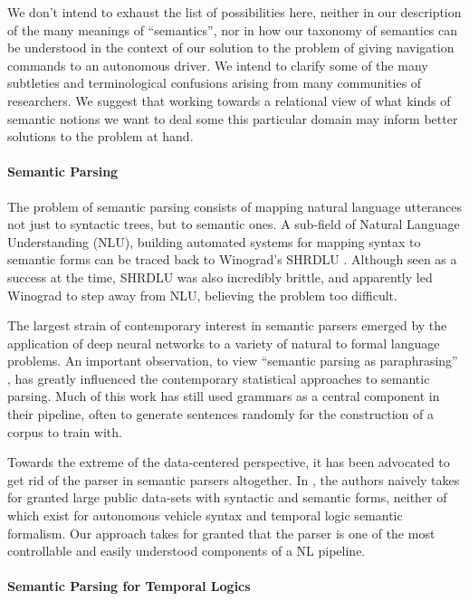 \documentclass{article}
\begin{document}
We don't intend to exhaust the list of possibilities here, neither in our
description of the many meanings of ``semantics'', nor in how our taxonomy of
semantics can be understood in the context of our solution to the problem of
giving navigation commands to an autonomous driver. We intend to clarify some of
the many subtleties and terminological confusions arising from many
communities of researchers. We suggest that working towards a relational view of
what kinds of semantic notions we want to deal some this particular domain may
inform better solutions to the problem at hand.

\paragraph{Semantic Parsing}

The problem of semantic parsing consists of mapping natural language utterances
not just to syntactic trees, but to semantic ones. A sub-field of Natural
Language Understanding (NLU), building automated systems for mapping syntax to
semantic forms can be traced back to Winograd's SHRDLU
\cite{winograd1971procedures}. Although seen as a success at the time, SHRDLU
was also incredibly brittle, and apparently led Winograd to step away from NLU,
believing the problem too difficult.

The largest strain of contemporary interest in semantic parsers emerged by the
application of deep neural networks to a variety of natural to formal language
problems. An important observation, to view ``semantic parsing as paraphrasing''
\cite{berant-liang-2014-semantic}, has greatly influenced the contemporary
statistical approaches to semantic parsing. Much of this work has still used
grammars as a central component in their pipeline, often to generate sentences
randomly for the construction of a corpus to train with.

Towards the extreme of the data-centered perspective, it has been advocated to
get rid of the parser in semantic parsers altogether. In \cite{dontParse}, the
authors naively takes for granted large public data-sets with syntactic and
semantic forms, neither of which exist for autonomous vehicle syntax and
temporal logic semantic formalism. Our approach takes for granted that the
parser is one of the most controllable and easily understood components of a NL
pipeline.

\paragraph{Semantic Parsing for Temporal Logics}
\end{document}
